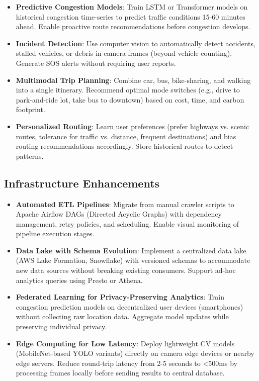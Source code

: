 \begin{itemize}
    \item \textbf{Predictive Congestion Models}: Train LSTM or Transformer models on historical congestion time-series to predict traffic conditions 15-60 minutes ahead. Enable proactive route recommendations before congestion develops.
    
    \item \textbf{Incident Detection}: Use computer vision to automatically detect accidents, stalled vehicles, or debris in camera frames (beyond vehicle counting). Generate SOS alerts without requiring user reports.
    
    \item \textbf{Multimodal Trip Planning}: Combine car, bus, bike-sharing, and walking into a single itinerary. Recommend optimal mode switches (e.g., drive to park-and-ride lot, take bus to downtown) based on cost, time, and carbon footprint.
    
    \item \textbf{Personalized Routing}: Learn user preferences (prefer highways vs. scenic routes, tolerance for traffic vs. distance, frequent destinations) and bias routing recommendations accordingly. Store historical routes to detect patterns.
\end{itemize}

\subsection{Infrastructure Enhancements}

\begin{itemize}
    \item \textbf{Automated ETL Pipelines}: Migrate from manual crawler scripts to Apache Airflow DAGs (Directed Acyclic Graphs) with dependency management, retry policies, and scheduling. Enable visual monitoring of pipeline execution stages.
    
    \item \textbf{Data Lake with Schema Evolution}: Implement a centralized data lake (AWS Lake Formation, Snowflake) with versioned schemas to accommodate new data sources without breaking existing consumers. Support ad-hoc analytics queries using Presto or Athena.
    
    \item \textbf{Federated Learning for Privacy-Preserving Analytics}: Train congestion prediction models on decentralized user devices (smartphones) without collecting raw location data. Aggregate model updates while preserving individual privacy.
    
    \item \textbf{Edge Computing for Low Latency}: Deploy lightweight CV models (MobileNet-based YOLO variants) directly on camera edge devices or nearby edge servers. Reduce round-trip latency from 2-5 seconds to <500ms by processing frames locally before sending results to central database.
\end{itemize}


